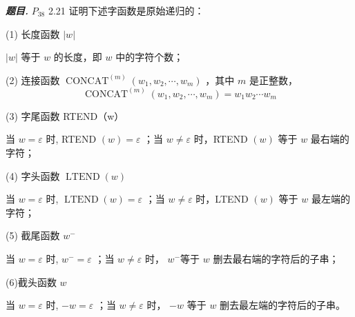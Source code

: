 \documentclass[10pt, a4paper, oneside]{ctexart}
\newenvironment{problem}{\begin{framed}\par\noindent\textbf{\textit{题目. }}}{\end{framed}\par}
\begin{document}
\begin{problem}
    $P_{38}$ 2.21 证明下述字函数是原始递归的：

(1) 长度函数 $|w|$

$|w|$ 等于 $w$ 的长度，即 $w$ 中的字符个数；

(2) 连接函数 $\operatorname{CONCAT}^{(m)}\left(w_1, w_2, \cdots, w_m\right)$ ，其中 $m$ 是正整数，
$$
\operatorname{CONCAT}^{(m)}\left(w_1, w_2, \cdots, w_m\right)=w_1 w_2 \cdots w_m
$$

(3) 字尾函数 RTEND（w）

当 $w=\varepsilon$ 时, RTEND $(w)=\varepsilon$ ；当 $w \neq \varepsilon$ 时，RTEND $(w)$ 等于 $w$ 最右端的字符；

(4) 字头函数 $\operatorname{LTEND}(w)$

当 $w=\varepsilon$ 时, $\operatorname{LTEND}(w)=\varepsilon$ ；当 $w \neq \varepsilon$ 时，LTEND $(w)$ 等于 $w$ 最左端的字符；

(5) 截尾函数 $w^{-}$

当 $w=\varepsilon$ 时, $w^{-}=\varepsilon$ ；当 $w \neq \varepsilon$ 时， $w^{-}$等于 $w$ 删去最右端的字符后的子串；

(6)截头函数 $w$

当 $w=\varepsilon$ 时, $-w=\varepsilon$ ；当 $w \neq \varepsilon$ 时， $-w$ 等于 $w$ 删去最左端的字符后的子串。
\end{problem}
\end{document}
